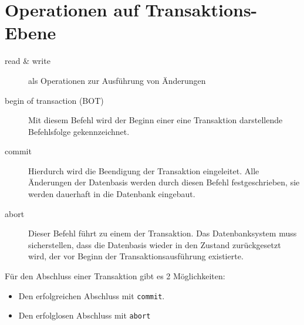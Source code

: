 \documentclass{lehramt-informatik-haupt}
\begin{document}
%

\section{Operationen auf Transaktions-Ebene}

\begin{liQuellen}
\item \cite[Seite 5]{db:fs:5}
\item \cite[Seite 211]{winter}
\item \cite[Kapitel 9.3, Seite 302-303]{kemper}
\end{liQuellen}

\begin{description}
\item[read \& write]

als Operationen zur Ausführung von Änderungen

\item[begin of transaction (BOT)]

Mit diesem Befehl wird der Beginn einer eine Transaktion darstellende
Befehlsfolge gekennzeichnet.

\item[commit]

Hierdurch wird die Beendigung der Transaktion eingeleitet. Alle
Änderungen der Datenbasis werden durch diesen Befehl festgeschrieben,
\dh sie werden dauerhaft in die Datenbank eingebaut.

\item[abort]

Dieser Befehl führt zu einem  der Transaktion. Das
Datenbanksystem muss sicherstellen, dass die Datenbasis wieder in den
Zustand zurückgesetzt wird, der vor Beginn der Transaktionsausführung
existierte.
\end{description}

\noindent
Für den Abschluss einer Transaktion gibt es 2 Möglichkeiten:

\begin{itemize}
\item Den erfolgreichen Abschluss mit \texttt{commit}.
\item Den erfolglosen Abschluss mit \texttt{abort}
\end{itemize}

%
\end{document}
